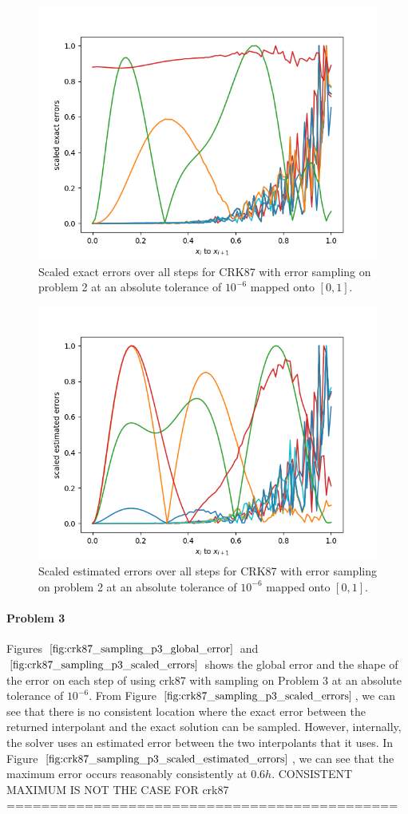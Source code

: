 \begin{figure}[H]
\centering
\includegraphics[width=0.7\linewidth]{./figures/crk87_sampling_p2_scaled_errors}
\caption{Scaled exact errors over all steps for CRK87 with error sampling on problem 2 at an absolute tolerance of $10^{-6}$ mapped onto $[0, 1]$.}
\label{fig:crk87_sampling_p2_scaled_errors}
\end{figure}

\begin{figure}[H]
\centering
\includegraphics[width=0.7\linewidth]{./figures/crk87_sampling_p2_scaled_estimated_errors}
\caption{Scaled estimated errors over all steps for CRK87 with error sampling on problem 2 at an absolute tolerance of $10^{-6}$ mapped onto $[0, 1]$.}
\label{fig:crk87_sampling_p2_scaled_estimated_errors}
\end{figure}

\paragraph{Problem 3} Figures $\ref{fig:crk87_sampling_p3_global_error}$ and $\ref{fig:crk87_sampling_p3_scaled_errors}$ shows the global error and the shape of the error on each step of using crk87 with sampling on Problem 3 at an absolute tolerance of $10^{-6}$. From Figure $\ref{fig:crk87_sampling_p3_scaled_errors}$, we can see that there is no consistent location where the exact error between the returned interpolant and the exact solution can be sampled. However, internally, the solver uses an estimated error between the two interpolants that it uses. In Figure $\ref{fig:crk87_sampling_p3_scaled_estimated_errors}$, we can see that the maximum error occurs reasonably consistently at $0.6h$.  CONSISTENT MAXIMUM IS NOT THE CASE FOR crk87 =============================================

